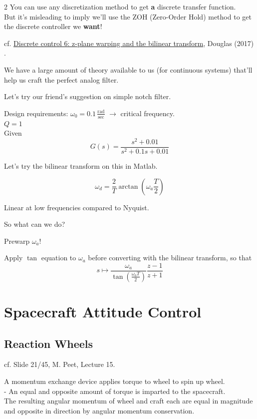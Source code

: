 \documentclass[10pt]{amsart}
\begin{document}
\begin{multicols*}{2}
You can use any discretization method to get \textbf{a} discrete transfer function. \\
But it's misleading to imply we'll use the ZOH (Zero-Order Hold) method to get the discrete controller we \textbf{want}!

cf. \href{https://youtu.be/NRbGPgcLhU0}{Discrete control 6: z-plane warping and the bilinear transform}, Douglas (2017) \cite{Doug2017}.

We have a large amount of theory available to us (for continuous systems) that'll help us craft the perfect analog filter.

Let's try our friend's suggestion on simple notch filter.

Design requirements: $\omega_0 = 0.1 \, \frac{ \text{rad} }{ \text{sec} }$ $\to $ critical frequency. \\
\phantom{Design requirements: } $Q=1$ \\

Given
\[
\boxed{ G(s) = \frac{s^2 + 0.01}{ s^2 + 0.1s + 0.01} }
\]

Let's try the bilinear transform on this in Matlab.


\begin{equation}
\omega_d = \frac{2}{T} \arctan{ \left( \omega_a \frac{T}{2} \right) }
\end{equation}

Linear at low frequencies compared to Nyquist. 

So what can we do?

Prewarp $\omega_a$!

Apply $\tan$ equation to $\omega_a$ before converting with the bilinear transform, so that
\[
s \mapsto \frac{ \omega_a}{\tan{\left(\frac{\omega_aT}{2}\right)}} \frac{z-1}{z+1}
\]

\section{Spacecraft Attitude Control}

\subsection{Reaction Wheels}

cf. Slide 21/45, M. Peet, Lecture 15.

A momentum exchange device applies torque to wheel to spin up wheel. \\
- An equal and opposite amount of torque is imparted to the spacecraft. \\
The resulting angular momentum of wheel and craft each are equal in magnitude and opposite in direction by angular momentum conservation.


\end{multicols*}
\end{document}

